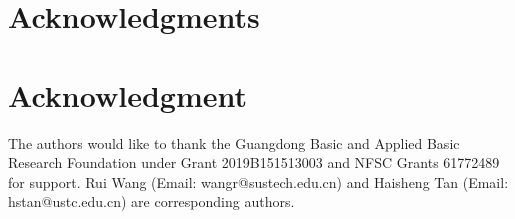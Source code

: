\documentclass[journal]{IEEEtran} %
\theoremstyle{definition}             %
\theoremstyle{remark}                 %
\theoremstyle{plain}                  %
\begin{document}
    
    {
      \ifCLASSOPTIONcompsoc
        \section*{Acknowledgments}
      \else
          \section*{Acknowledgment}
      \fi
      The authors would like to thank the Guangdong Basic and Applied Basic Research Foundation under Grant 2019B151513003 and NFSC Grants 61772489 for support.
      Rui Wang (Email: wangr@sustech.edu.cn) and Haisheng Tan (Email: hstan@ustc.edu.cn) are corresponding authors.
    }%

    \ifCLASSOPTIONcaptionsoff
        \newpage
    \fi

    
    

    
\end{document}
